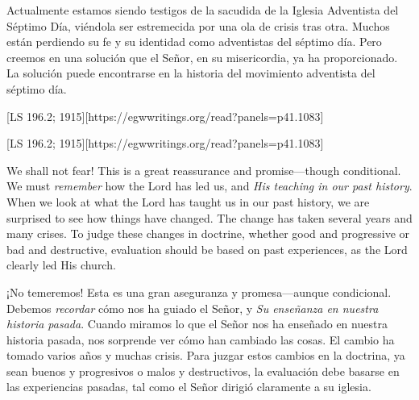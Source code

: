 Actualmente estamos siendo testigos de la sacudida de la Iglesia Adventista del Séptimo Día, viéndola ser estremecida por una ola de crisis tras otra. Muchos están perdiendo su fe y su identidad como adventistas del séptimo día. Pero creemos en una solución que el Señor, en su misericordia, ya ha proporcionado. La solución puede encontrarse en la historia del movimiento adventista del séptimo día.


[LS 196.2; 1915][https://egwwritings.org/read?panels=p41.1083]


[LS 196.2; 1915][https://egwwritings.org/read?panels=p41.1083]


We shall not fear! This is a great reassurance and promise—though conditional. We must \textit{remember} how the Lord has led us, and \textit{His teaching in our past history}. When we look at what the Lord has taught us in our past history, we are surprised to see how things have changed. The change has taken several years and many crises. To judge these changes in doctrine, whether good and progressive or bad and destructive, evaluation should be based on past experiences, as the Lord clearly led His church.


¡No temeremos! Esta es una gran aseguranza y promesa—aunque condicional. Debemos \textit{recordar} cómo nos ha guiado el Señor, y \textit{Su enseñanza en nuestra historia pasada}. Cuando miramos lo que el Señor nos ha enseñado en nuestra historia pasada, nos sorprende ver cómo han cambiado las cosas. El cambio ha tomado varios años y muchas crisis. Para juzgar estos cambios en la doctrina, ya sean buenos y progresivos o malos y destructivos, la evaluación debe basarse en las experiencias pasadas, tal como el Señor dirigió claramente a su iglesia.


